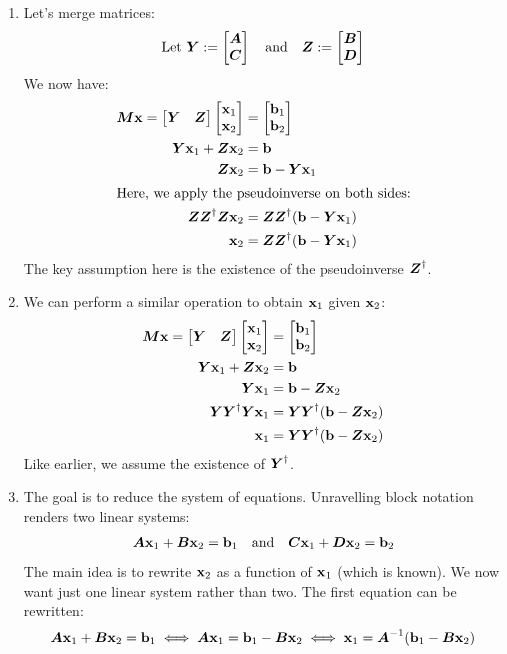 \documentclass[]{exam}
\begin{document}
\begin{questions}
\begin{enumerate}[label=\arabic*.]
	\item Let's merge matrices:
		\begin{gather*}
			\mathrm{Let~} \mY := \bmat{\mA \\ \mC} \quad \mathrm{and} \quad \mZ := \bmat{\mB \\ \mD}
		\end{gather*}
		We now have:
		\begin{align*}
			\mM \vx = \bmat{\mY & \mZ} \bmat{\vx_1 \\ \vx_2} &= \bmat{\vb_1 \\ \vb_2} \\
			\mY \vx_1 + \mZ \vx_2 &= \vb \\
			\mZ \vx_2 &= \vb - \mY \vx_1 \\
			\intertext{Here, we apply the pseudoinverse on both sides:}
			\mZ \mZ^{\dagger} \mZ \vx_2 &= \mZ \mZ^{\dagger} (\vb - \mY \vx_1) \\
			\vx_2 &= \mZ \mZ^{\dagger} (\vb - \mY \vx_1)
		\end{align*}
		The key assumption here is the existence of the pseudoinverse $\mZ^{\dagger}$.
	\item We can perform a similar operation to obtain $\vx_1$ given $\vx_2$:
		\begin{align*}
			\mM \vx = \bmat{\mY & \mZ} \bmat{\vx_1 \\ \vx_2} &= \bmat{\vb_1 \\ \vb_2} \\
			\mY \vx_1 + \mZ \vx_2 &= \vb \\
			\mY \vx_1 &= \vb - \mZ \vx_2 \\
			\mY \mY^{\dagger} \mY \vx_1 &= \mY \mY^{\dagger} (\vb - \mZ \vx_2) \\
			\vx_1 &= \mY \mY^{\dagger} (\vb - \mZ \vx_2)
		\end{align*}
		Like earlier, we assume the existence of $\mY^\dagger$.
	\item The goal is to reduce the system of equations. Unravelling block notation renders two linear systems:
		\begin{gather*}
			\mA \vx_1 + \mB \vx_2 = \vb_1 \quad \mathrm{and} \quad \mC \vx_1 + \mD \vx_2 = \vb_2
		\end{gather*}
		The main idea is to rewrite $\vx_2$ as a function of $\vx_1$ (which is known). We now want just one linear system rather than two.
		The first equation can be rewritten:
		\begin{gather*}
			\mA \vx_1 + \mB \vx_2 = \vb_1 \iff \mA \vx_1 = \vb_1 - \mB \vx_2 \iff \vx_1 = \mA^{-1} (\vb_1 - \mB \vx_2)

\end{gather*}
\end{enumerate}
\end{questions}
\end{document}

